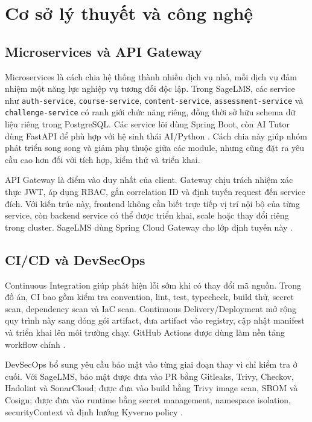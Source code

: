 \chapter{Cơ sở lý thuyết và công nghệ}
\label{chap:background}

\section{Microservices và API Gateway}

Microservices là cách chia hệ thống thành nhiều dịch vụ nhỏ, mỗi dịch vụ đảm nhiệm một năng lực nghiệp vụ tương đối độc lập. Trong SageLMS, các service như \texttt{auth-service}, \texttt{course-service}, \texttt{content-service}, \texttt{assessment-service} và \texttt{challenge-service} có ranh giới chức năng riêng, đồng thời sở hữu schema dữ liệu riêng trong PostgreSQL. Các service lõi dùng Spring Boot, còn AI Tutor dùng FastAPI để phù hợp với hệ sinh thái AI/Python \cite{springBoot,fastapiDocs}. Cách chia này giúp nhóm phát triển song song và giảm phụ thuộc giữa các module, nhưng cũng đặt ra yêu cầu cao hơn đối với tích hợp, kiểm thử và triển khai.

API Gateway là điểm vào duy nhất của client. Gateway chịu trách nhiệm xác thực JWT, áp dụng RBAC, gắn correlation ID và định tuyến request đến service đích. Với kiến trúc này, frontend không cần biết trực tiếp vị trí nội bộ của từng service, còn backend service có thể được triển khai, scale hoặc thay đổi riêng trong cluster. SageLMS dùng Spring Cloud Gateway cho lớp định tuyến này \cite{springCloudGateway}.

\section{CI/CD và DevSecOps}

Continuous Integration giúp phát hiện lỗi sớm khi có thay đổi mã nguồn. Trong đồ án, CI bao gồm kiểm tra convention, lint, test, typecheck, build thử, secret scan, dependency scan và IaC scan. Continuous Delivery/Deployment mở rộng quy trình này sang đóng gói artifact, đưa artifact vào registry, cập nhật manifest và triển khai lên môi trường chạy. GitHub Actions được dùng làm nền tảng workflow chính \cite{githubActions}.

DevSecOps bổ sung yêu cầu bảo mật vào từng giai đoạn thay vì chỉ kiểm tra ở cuối. Với SageLMS, bảo mật được đưa vào PR bằng Gitleaks, Trivy, Checkov, Hadolint và SonarCloud; được đưa vào build bằng Trivy image scan, SBOM và Cosign; được đưa vào runtime bằng secret management, namespace isolation, securityContext và định hướng Kyverno policy \cite{gitleaks,kyvernoDocs}.

